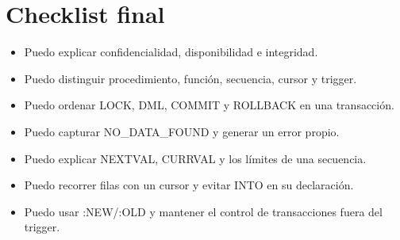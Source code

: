 \documentclass[11pt,a4paper]{article}
\begin{document}
\section*{Checklist final}
\begin{itemize}[leftmargin=*]
\item Puedo explicar confidencialidad, disponibilidad e integridad.
\item Puedo distinguir procedimiento, función, secuencia, cursor y trigger.
\item Puedo ordenar LOCK, DML, COMMIT y ROLLBACK en una transacción.
\item Puedo capturar NO_DATA_FOUND y generar un error propio.
\item Puedo explicar NEXTVAL, CURRVAL y los límites de una secuencia.
\item Puedo recorrer filas con un cursor y evitar INTO en su declaración.
\item Puedo usar :NEW/:OLD y mantener el control de transacciones fuera del trigger.
\end{itemize}
\end{document}
